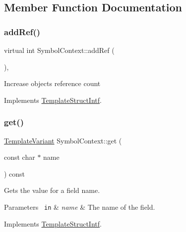 \subsection{Member Function Documentation}
\mbox{\label{class_symbol_context_abc94a79c870f23c5581c82fe63f54ace}} 
\subsubsection{\texorpdfstring{addRef()}{addRef()}}
{\footnotesize\ttfamily virtual int Symbol\+Context\+::add\+Ref (\begin{DoxyParamCaption}{ }\end{DoxyParamCaption})\hspace{0.3cm}{\ttfamily [inline]}, {\ttfamily [virtual]}}

Increase object\textquotesingle{}s reference count 

Implements \mbox{\hyperlink{class_template_struct_intf_a05fe97ad47633beb326f69686faed581}{Template\+Struct\+Intf}}.

\mbox{\label{class_symbol_context_a109b5825564a5f59bb84905c8eb9990f}} 
\subsubsection{\texorpdfstring{get()}{get()}}
{\footnotesize\ttfamily \mbox{\hyperlink{class_template_variant}{Template\+Variant}} Symbol\+Context\+::get (\begin{DoxyParamCaption}\item[{const char $\ast$}]{name }\end{DoxyParamCaption}) const\hspace{0.3cm}{\ttfamily [virtual]}}

Gets the value for a field name. 
\begin{DoxyParams}[1]{Parameters}
\mbox{\texttt{ in}}  & {\em name} & The name of the field. \\
\hline
\end{DoxyParams}


Implements \mbox{\hyperlink{class_template_struct_intf_a3d610cb81b4adbb531ebed3aa3d09b51}{Template\+Struct\+Intf}}.

\mbox{\label{class_symbol_context_ac6ec8d1afe939fc64ac4f43a57220da6}} 
